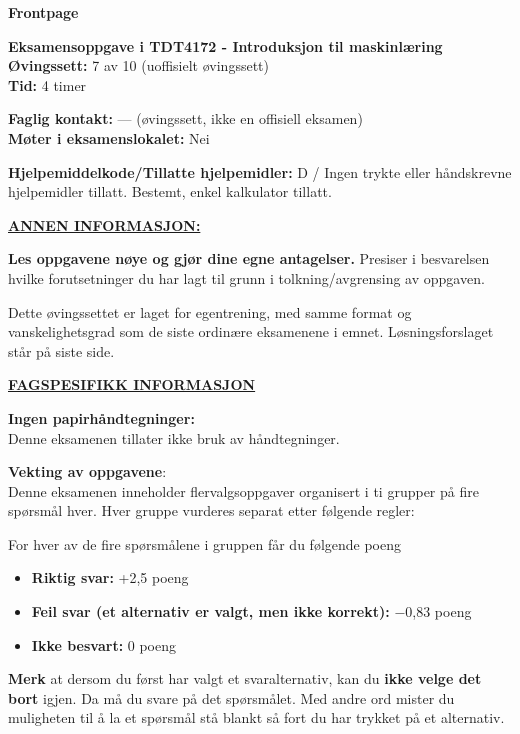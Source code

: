 \documentclass[11pt,a4paper]{article}
\begin{document}
\noindent\hspace*{-1.55em}%
{\sffamily\bfseries\fontsize{18}{22}\selectfont Frontpage}\par\vspace{1.1em}

{\bfseries Eksamensoppgave i TDT4172 - Introduksjon til maskinlæring}\\
{\bfseries Øvingssett:} 7 av 10 (uoffisielt øvingssett)\\
{\bfseries Tid:} 4 timer

\vspace{0.6em}
{\bfseries Faglig kontakt:} --- (øvingssett, ikke en offisiell eksamen)\\
{\bfseries Møter i eksamenslokalet:} Nei

\vspace{0.6em}
{\bfseries Hjelpemiddelkode/Tillatte hjelpemidler:} D / Ingen trykte eller håndskrevne hjelpemidler tillatt.
Bestemt, enkel kalkulator tillatt.

\vspace{0.6em}
{\bfseries\underline{ANNEN INFORMASJON:}}

\vspace{0.4em}
{\bfseries Les oppgavene nøye og gjør dine egne antagelser.} Presiser i besvarelsen hvilke forutsetninger du
har lagt til grunn i tolkning/avgrensing av oppgaven.

Dette øvingssettet er laget for egentrening, med samme format og vanskelighetsgrad som de
siste ordinære eksamenene i emnet. Løsningsforslaget står på siste side.

\vspace{1.6em}
{\bfseries\underline{FAGSPESIFIKK INFORMASJON}}

\vspace{0.4em}
{\bfseries Ingen papirhåndtegninger:}\\
Denne eksamenen tillater ikke bruk av håndtegninger.

\vspace{1.4em}
{\bfseries Vekting av oppgavene}:\\
Denne eksamenen inneholder flervalgsoppgaver organisert i ti grupper på fire spørsmål hver. Hver
gruppe vurderes separat etter følgende regler:

\vspace{0.6em}
For hver av de fire spørsmålene i gruppen får du følgende poeng
\begin{itemize}[leftmargin=2.2em,label=\textperiodcentered,itemsep=0pt]
\item {\bfseries Riktig svar:} +2,5 poeng
\item {\bfseries Feil svar (et alternativ er valgt, men ikke korrekt):} $-$0,83 poeng
\item {\bfseries Ikke besvart:} 0 poeng
\end{itemize}
{\bfseries Merk} at dersom du først har valgt et svaralternativ, kan du {\bfseries ikke velge det bort} igjen. Da må du
svare på det spørsmålet. Med andre ord mister du muligheten til å la et spørsmål stå blankt så fort
du har trykket på et alternativ.
\end{document}
